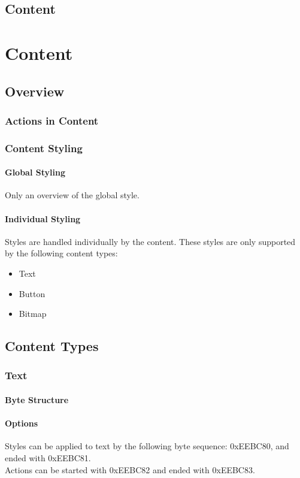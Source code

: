 \documentclass{report}
\begin{document}
\section{Content}
\chapter{Content}
\section{Overview}
\subsection{Actions in Content}
\subsection{Content Styling}
\subsubsection{Global Styling}
Only an overview of the global style.
\subsubsection{Individual Styling}
Styles are handled individually by the content. These styles are only supported by the following content types:
\begin{itemize}
\item Text
\item Button
\item Bitmap
\end{itemize}
\section{Content Types}
\subsection{Text}
\subsubsection{Byte Structure}
\subsubsection{Options}
Styles can be applied to text by the following byte sequence: 0xEEBC80, and ended with 0xEEBC81.\\
Actions can be started with 0xEEBC82 and ended with 0xEEBC83.
\end{document}
